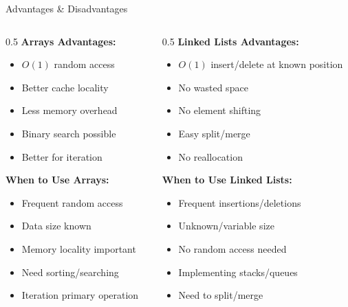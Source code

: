 \documentclass[aspectratio=169,xcolor=dvipsnames]{beamer}
\begin{document}
\begin{frame}{Advantages \& Disadvantages}
  \begin{columns}
    \begin{column}{0.5\textwidth}
      \textbf{Arrays Advantages:}
      \begin{itemize}
        \item \checkmark $O(1)$ random access
        \item \checkmark Better cache locality
        \item \checkmark Less memory overhead
        \item \checkmark Binary search possible
        \item \checkmark Better for iteration
      \end{itemize}

      \vspace{0.3cm}
      \textbf{When to Use Arrays:}
      \begin{itemize}
        \item Frequent random access
        \item Data size known
        \item Memory locality important
        \item Need sorting/searching
        \item Iteration primary operation
      \end{itemize}
    \end{column}

    \begin{column}{0.5\textwidth}
      \textbf{Linked Lists Advantages:}
      \begin{itemize}
        \item \checkmark $O(1)$ insert/delete at known position
        \item \checkmark No wasted space
        \item \checkmark No element shifting
        \item \checkmark Easy split/merge
        \item \checkmark No reallocation
      \end{itemize}

      \vspace{0.3cm}
      \textbf{When to Use Linked Lists:}
      \begin{itemize}
        \item Frequent insertions/deletions
        \item Unknown/variable size
        \item No random access needed
        \item Implementing stacks/queues
        \item Need to split/merge
      \end{itemize}
    \end{column}
  \end{columns}
\end{frame}
\end{document}
